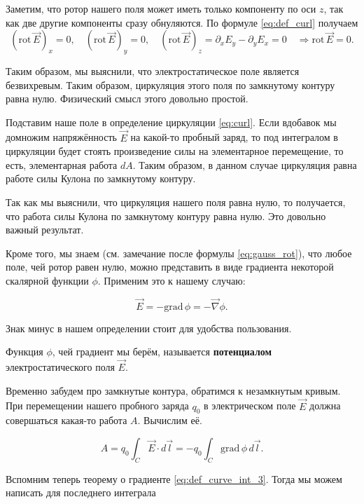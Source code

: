 \documentclass[11pt,a4paper]{article}
\numberwithin{equation}{section}
\newcommand{\pt}{\partial}
\newcommand{\grad}{\mathrm{grad}\,}
\newcommand{\rot}{\mathrm{rot}\,}
\newcommand{\vn}{\vec{\nabla}}
\begin{document}
Заметим, что ротор нашего поля может иметь только компоненту по оси
$z$, так как две другие компоненты сразу обнуляются. По формуле
\eqref{eq:def_curl} получаем
\begin{equation}
  \label{eq:rot_electrostatics_2}
 \left( \rot \vec{E} \right)_x =0, \quad  \left( \rot \vec{E}
 \right)_y =0, \quad \left( \rot \vec{E} \right)_z = \pt_x E_y - \pt_y
 E_x = 0 \quad \Rightarrow \rot \vec{E} =0.
\end{equation}

Таким образом, мы выяснили, что электростатическое поле является
безвихревым. Таким образом, циркуляция этого поля по замкнутому
контуру равна нулю. Физический смысл этого довольно простой. 

Подставим наше поле в определение циркуляции \eqref{eq:curl}. Если
вдобавок мы домножим напряжённость $\vec{E}$ на какой-то пробный
заряд, то под интегралом в циркуляции будет стоять произведение силы
на элементарное перемещение, то есть, элементарная работа $dA$. Таким
образом, в данном случае циркуляция равна работе силы Кулона по
замкнутому контуру. 

Так как мы выяснили, что циркуляция нашего поля равна нулю, то
получается, что работа силы Кулона по замкнутому контуру равна
нулю. Это довольно важный результат. 

Кроме того, мы знаем (см. замечание после формулы
\eqref{eq:gauss_rot}), что любое поле, чей ротор равен нулю, можно
представить в виде градиента некоторой скалярной функции
$\phi$. Применим это к нашему случаю:

\begin{equation}
  \label{eq:def_potential}
  \vec{E}  = -\grad \phi = -\vn \phi.
\end{equation}

Знак минус в нашем определении стоит для удобства пользования. 

Функция $\phi$, чей градиент мы берём, называется \textbf{потенциалом}
электростатического поля $\vec{E}$. 

Временно забудем про замкнутые контура, обратимся к незамкнутым
кривым. При перемещении нашего пробного заряда $q_0$ в электрическом поле
$\vec{E}$ должна совершаться какая-то работа $A$. Вычислим её. 

\begin{equation}
  \label{eq:work_statics_1}
  A = q_0 \int_C \vec{E} \cdot d\vec{l} = -q_0 \int_C \grad \phi\, d\vec{l}.
\end{equation}

Вспомним теперь теорему о градиенте \eqref{eq:def_curve_int_3}. Тогда
мы можем написать для последнего интеграла
\end{document}
